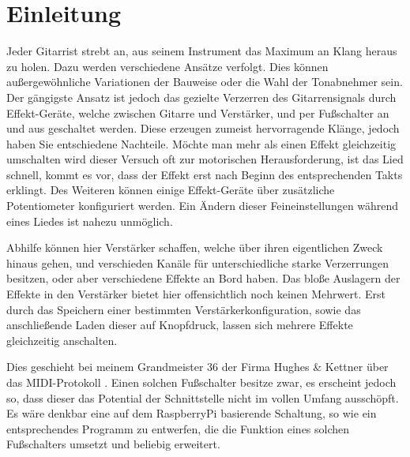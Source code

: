 \chapter{Einleitung}
Jeder Gitarrist strebt an, aus seinem Instrument das Maximum an Klang heraus zu holen. Dazu werden verschiedene Ansätze verfolgt. Dies können außergewöhnliche Variationen der Bauweise oder die Wahl der Tonabnehmer sein. Der gängigste Ansatz ist jedoch das gezielte Verzerren des Gitarrensignals durch Effekt-Geräte, welche zwischen Gitarre und Verstärker, und per Fußschalter an und aus geschaltet werden. Diese erzeugen zumeist hervorragende Klänge, jedoch haben Sie entschiedene Nachteile. Möchte man mehr als einen Effekt gleichzeitig umschalten wird dieser Versuch oft zur motorischen Herausforderung, ist das Lied schnell, kommt es vor, dass der Effekt erst nach Beginn des entsprechenden Takts erklingt. Des Weiteren können einige Effekt-Geräte über zusätzliche Potentiometer konfiguriert werden. Ein Ändern dieser Feineinstellungen während eines Liedes ist nahezu unmöglich.

Abhilfe können hier Verstärker schaffen, welche über ihren eigentlichen Zweck hinaus gehen, und verschieden Kanäle für unterschiedliche starke Verzerrungen besitzen, oder aber verschiedene Effekte an Bord haben. Das bloße Auslagern der Effekte in den Verstärker bietet hier offensichtlich noch keinen Mehrwert. Erst durch das Speichern einer bestimmten Verstärkerkonfiguration, sowie das anschließende Laden dieser auf Knopfdruck, lassen sich mehrere Effekte gleichzeitig anschalten.

Dies geschieht bei meinem Grandmeister 36 der Firma Hughes & Kettner über das MIDI-Protokoll . Einen solchen Fußschalter besitze zwar,  es erscheint jedoch so, dass dieser das Potential der Schnittstelle nicht im vollen Umfang ausschöpft. Es wäre denkbar eine auf dem RaspberryPi basierende Schaltung, so wie ein entsprechendes Programm zu entwerfen, die die Funktion eines solchen Fußschalters umsetzt und beliebig erweitert. 

